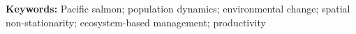 
\noindent \textbf{Keywords:} Pacific salmon; population dynamics; environmental
change; spatial non-stationarity; ecosystem-based management; productivity

